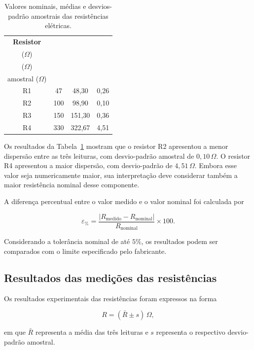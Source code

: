 \documentclass[a4paper,12pt]{article}
\begin{document}
\begin{table}[H]
    \centering
    \caption{Valores nominais, médias e desvios-padrão amostrais
    das resistências elétricas.}
    \label{tab:medias_desvios_resistores}
    \medskip

    \begin{tabular}{cccc}
        \toprule
        \textbf{Resistor}
        & \shortstack{\textbf{Valor nominal}\\($\Omega$)}
        & \shortstack{\textbf{Média medida}\\($\Omega$)}
        & \shortstack{\textbf{Desvio-padrão}\\amostral ($\Omega$)}
        \\
        \midrule
        R1 & 47  & 48,30  & 0,26 \\
        R2 & 100 & 98,90  & 0,10 \\
        R3 & 150 & 151,30 & 0,36 \\
        R4 & 330 & 322,67 & 4,51 \\
        \bottomrule
    \end{tabular}
\end{table}
Os resultados da Tabela~\ref{tab:medias_desvios_resistores}
mostram que o resistor R2 apresentou a menor dispersão entre as três
leituras, com desvio-padrão amostral de \(0,10\,\Omega\). O resistor R4
apresentou a maior dispersão, com desvio-padrão de \(4,51\,\Omega\).
Embora esse valor seja numericamente maior, sua interpretação deve
considerar também a maior resistência nominal desse componente.


A diferença percentual entre o valor medido e o valor nominal foi calculada por

\[
  \varepsilon_{\%}
  =\frac{\lvert R_{\mathrm{medido}}-R_{\mathrm{nominal}}\rvert}
  {R_{\mathrm{nominal}}}\times 100.
\]

Considerando a tolerância nominal de até $5\%$, os resultados podem
ser comparados com o limite especificado pelo fabricante.

\subsection{Resultados das medições das resistências}

Os resultados experimentais das resistências foram expressos na forma

\[
    R=(\bar{R}\pm s)\,\Omega,
\]

em que \(\bar{R}\) representa a média das três leituras e \(s\)
representa o respectivo desvio-padrão amostral.
\end{document}
